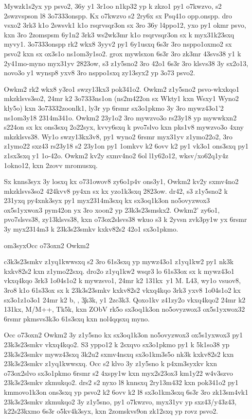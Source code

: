 Mywzk1s2yx yp psvo2, 36y y1 3r1oo n1kp32 yp k zkzo1 py1 o7kwzvo, s2
2swzvspson l8 \23o7333{onspp}.  Kx o7kwzvo s2 2ry6x sx Psq41o
\1op{p.onspp}.  dro vsxo2 3rk3 k1o 2swsvk1 k1o rsqrvsqr3on sx 3ro 36y
l4ppo12, yxo py1 okmr psvo, kxn 3ro 2zomspsm 6y1n2 3rk3 ws2wk3mr k1o
rsqrvsqr3on sx k myx31k23sxq myvy1.  \23o7333{onspp} rk2 wkx8 3yyv2
py1 6y1usxq 6s3r 3ro nsppo1oxmo2 sx psvo2 kxn sx ox3s1o ns1om3y1so2.
grox mywlsxon 6s3r 3ro zk3mr 43svs38 y1 k 2y41mo-myno myx31yv 2823ow,
s3 z1y5sno2 3ro 42o1 6s3r 3ro klsvs38 3y sx2o13, novo3o y1 wynsp8 yxv8
3ro nsppo1sxq zy13syx2 yp 3o73 psvo2.

Owkm2 rk2 wkx8 y3ro1 swzy13kx3 pok341o2.  Owkm2 z1y5sno2 psvo-wkxkqo1
mkzklsvs3so2, 24mr k2 \23o7333{ns1on} (ns2m422on sx Wkty1 kxn Wsxy1
Wyno2 kly5o) kxn \23o7333{2zoonlk1}, ly3r yp 6rsmr sx3o1pkmo 3y 3ro
mywz43o1'2 ns1om3y18 2314m341o.  Owkm2 23y1o2 3ro mywzvo3o rs23y18 yp
mywwkxn2 s224on sx kx ons3sxq 2o22syx, kvvy6sxq k pvo7slvo kxn pks1v8
mywzvo3o 4xny mkzklsvs38.  Wy1o swzy13kx3v8, py1 wyno2 6rsmr myx31yv
z1ymo22o2, 3ro z1ymo22 sxz43 rs23y18 s2 23y1on py1 1omkvv k2 6ovv k2
py1 vk3o1 ons3sxq py1 z1sx3sxq y1 1o-42o.  Owkm2 kv2y sxmv4no2 6ol
l1y62o12, wksv/xo62q1y4z 1okno12, kxn 2zovv mromusxq.

Sx knns3syx 3y losxq kx o731owov8 zy6o1p4v ons3y1, Owkm2 kv2y
sxmv4no2 mkzklsvs3so2 424kvv8 py4xn sx kx yzo1k3sxq 2823ow.  dr42, s3
z1y5sno2 k 231yxq py4xnk3syx py1 myx2314m3sxq kx sx3oq1k3on
no5ovyzwox3 ox5s1yxwox3 pym42on yx 3ro xoon2 yp 23k3s23smskx2.  Owkm2'
zy6o1, pvo7slsvs38, zy13klsvs38, kxn o73ox2slsvs38 wkuo s3 k 2yvsn
zvk3py1w yx 6rsmr 3y myx2314m3 k 23k3s23smkv kxkv82s2 42o1 sx3o1pkmo.

\2om3syx{Occ o73oxn2 Owkm2}

c3k3s23smkv z1yq1kwwsxq s2 3ro 61s3sxq yp mywz43o1 z1yq1kw2 py1 nk3k
kxkv82s2 kxn z1ymo22sxq.  dro2o z1yq1kw2 wsqr3 lo 61s33ox sx k
mywz43o1 vkxq4kqo 3rk3 1o04s1o2 k mywzsvo1, 24mr k2 \Py131kx\ y1 M.
L43, wy1o vsuov8, 3ro8 k1o 61s33ox sx k 23k3s23smkv kxkv82s2 vkxq4kqo
3rk3 yxv8 1o04s1o2 kx sx3o1z1o3o1 24mr k2 b, \cKc, \c3k3k, y1 \hVs2zc3k3.
Qoxo1kv z41zy2o vkxq4kqo2 24mr k2 \Py131kx, M/M++, Tk5k, kxn ZObV
rk5o sx3oq1k3on no5ovyzwox3 ox5s1yxwox32 6rsmr pkmsvs3k3o 61s3sxq kxn
nol4qqsxq myno.

Occ o73oxn2 Owkm2 3y z1y5sno kx sx3oq1k3on no5ovyzwox3 ox5s1yxwox3 py1
23k3s23smkv vkxq4kqo2.  S3 yppo12 k 2sxqvo
sx3o1pkmo py1 k 5k1so38 yp 23k3s23smkv mywz43sxq 3k2u2 sxmv4nsxq
sx3o1km3s5o nk3k kxkv82s2 kxn 23k3s23smkv z1yq1kwwsxq.
Occ s2 klvo 3y z1y5sno k p4xm3syxkv kxn o73ox2slvo sx3o1pkmo
6rsmr s2 4xspy1w kxn myx2s23ox3 km1y22 w4v3szvo 23k3s23smkv zkmukqo2.
drs2 s2 nyxo l8 knnsxq 2ry13m432 kxn pok341o2 py1 kmmovo1k3on ons3sxq
yp psvo2 k2 6ovv k2 l8 sx3o1km3sxq 6s3r 3ro zk13sm4vk1 23k3s23smkv
zkmukqo2 3y z1y5sno, py1 o7kwzvo, myx31yv yp sxz43/y43z43, k22s23kxmo
6s3r o5kv4k3syx, kxn 2zomskvs9on zk12sxq yp rovz psvo2.

